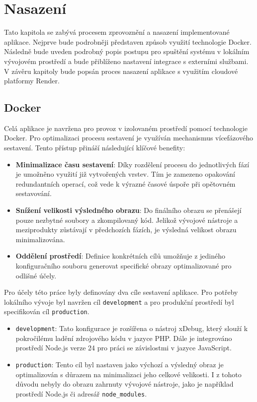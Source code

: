 \chapter{Nasazení}
Tato kapitola se zabývá procesem zprovoznění a nasazení implementované aplikace. Nejprve bude podrobněji představen způsob využití technologie Docker. Následně bude uveden podrobný popis postupu pro spuštění systému v lokálním vývojovém prostředí a bude přiblíženo nastavení integrace s externími službami. V závěru kapitoly bude popsán proces nasazení aplikace s využitím cloudové platformy Render.

\section{Docker}
Celá aplikace je navržena pro provoz v izolovaném prostředí pomocí technologie Docker. Pro optimalizaci procesu sestavení je využíván mechanismus vícefázového sestavení. Tento přístup přináší následující klíčové benefity:

\begin{itemize}
    \item \textbf{Minimalizace času sestavení}: Díky rozdělení procesu do jednotlivých fází je umožněno využití již vytvořených vrstev. Tím je zamezeno opakování redundantních operací, což vede k výrazné časové úspoře při opětovném sestavování.
    \item \textbf{Snížení velikosti výsledného obrazu}: Do finálního obrazu se přenášejí pouze nezbytné soubory a zkompilovaný kód. Jelikož vývojové nástroje a meziprodukty zůstávají v předchozích fázích, je výsledná velikost obrazu minimalizována.
    \item \textbf{Oddělení prostředí}: Definice konkrétních cílů umožňuje z jediného konfiguračního souboru generovat specifické obrazy optimalizované pro odlišné účely.
\end{itemize}

\newpage
Pro účely této práce byly definovány dva cíle sestavení aplikace. Pro potřeby lokálního vývoje byl navržen cíl \texttt{development} a pro produkční prostředí byl specifikován cíl \texttt{production}.

\begin{itemize}
    \item \texttt{development}: Tato konfigurace je rozšířena o nástroj xDebug, který slouží k pokročilému ladění zdrojového kódu v jazyce PHP. Dále je integrováno prostředí Node.js verze 24 pro práci se závislostmi v jazyce JavaScript.
    \item \texttt{production}: Tento cíl byl nastaven jako výchozí a výsledný obraz je optimalizován s důrazem na minimalizaci jeho celkové velikosti. I z tohoto důvodu nebyly do obrazu zahrnuty vývojové nástroje, jako je například prostředí Node.js či adresář \texttt{node\_modules}.
\end{itemize}

